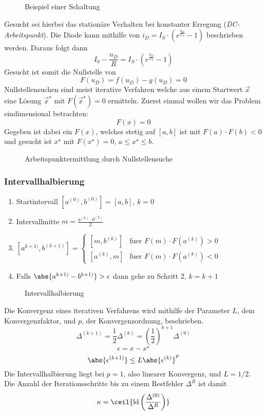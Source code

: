 \begin{figure}[htdp]
	\center
	
	\caption{Beispiel einer Schaltung}
\end{figure}

Gesucht sei hierbei das stationäre Verhalten bei konstanter Erregung (\emph{DC-Arbeitspunkt}). Die Diode kann mithilfe von $i_D = I_S \cdot \left(e^{\frac{u_D}{U_T}} - 1\right)$ beschrieben werden. Daraus folgt dann
\[I_0 - \frac{u_D}{R} = I_S \cdot \left(e^{\frac{u_D}{U_T}} - 1\right)\]
Gesucht ist somit die Nullstelle von
\[F(u_D) = f(u_D) - g(u_D) = 0\]
Nullstellensuchen sind meist iterative Verfahren welche aus einem Startwert $\vec{x}$ eine Lösung $\vec{x}^\star$ mit $F(\vec{x}^\star) = 0$ ermitteln. Zuerst einmal wollen wir das Problem eindimensional betrachten:
\[F(x) = 0\]
Gegeben ist dabei ein $F(x)$, welches stetig auf $[a, b]$ ist mit $F(a) \cdot F(b) < 0$ und gesucht ist $x^\star$ mit $F(x^\star) = 0$, $a \le x^\star \le b$.

\begin{figure}[htdp]
	\center
	
	\caption{Arbeitspunktermittlung durch Nullstellensuche}
\end{figure}

\subsubsection{Intervallhalbierung}
\begin{enumerate}
	\item Startintervall $[a^{(0)}, b^{(0)}] = [a, b]$, $k = 0$
	\item Intervallmitte $m = \frac{a^{(k)} \cdot b^{(k)}}{2}$
	\item $[a^{k + 1)}, b^{(k + 1)}] = \begin{cases} [m, b^{(k)}] & \text{fuer\ } F(m) \cdot F(a^{(k)}) > 0 \\ [a^{(k)}, m] & \text{fuer\ } F(m) \cdot F(a^{(k)}) < 0 \end{cases}$
	\item Falls $\abs{a^{k + 1)} - b^{k + 1)}} > \epsilon$ dann gehe zu Schritt 2, $k = k + 1$
\end{enumerate}

\begin{figure}[htdp]
	\center
	
	\caption{Intervallhalbierung}
\end{figure}

Die Konvergenz eines iterativen Verfahrens wird mithilfe der Parameter $L$, dem Konvergenzfaktor, und $p$, der Konvergenzordnung, beschrieben.
\[\Delta^{(k + 1)} = \frac{1}{2} \Delta^{(k)} = (\frac{1}{2})^{k + 1} \Delta^{(0)}\]
\[\epsilon = x - x^\star\]
\[\abs{\epsilon^{(k + 1)}} \le L \abs{\epsilon^{(k)}}^p\]
Die Intervallhalbierung liegt bei $p = 1$, also linearer Konvergenz, und $L = 1/2$. Die Anzahl der Iterationsschritte bis zu einem Restfehler $\Delta^R$ ist damit
\[\kappa = \ceil{\log2 \left( \frac{\Delta^{(0)}}{\Delta^R}\right)}\]

